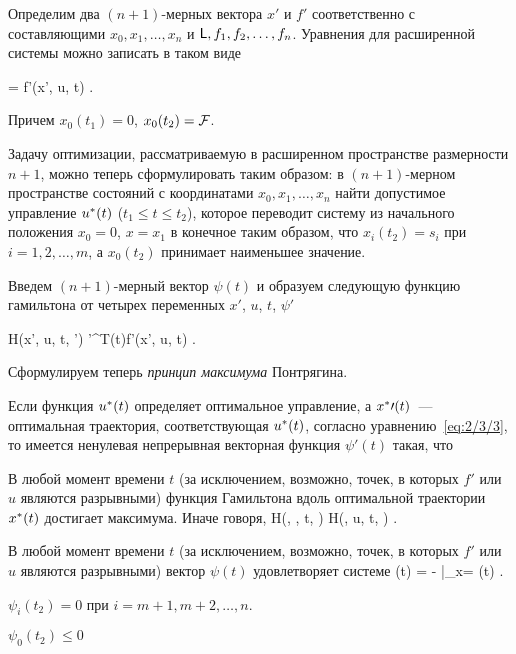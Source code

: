 Определим два $(n+1)$-мерных вектора $x'$ и $f'$ соответственно с составляющими $x_0, x_1, \ldots, x_n$ и $\mathsf{L}, f_1, f_2, \ldots, f_n$. Уравнения для расширенной системы можно записать в таком виде

     = f'(x', u, t) \mbox{.}
\eeq

Причем $x_0(t_1) = 0$, $x_0(t_2) = \mathcal{F}$.

Задачу оптимизации, рассматриваемую в расширенном пространстве размерности $n+1$, можно теперь сформулировать таким образом: в $(n+1)$-мерном пространстве состояний с координатами $x_0, x_1, \ldots, x_n$ найти допустимое управление $u^{*}(t)$ ($t_1 \leqslant t \leqslant t_2$), которое переводит систему из начального положения $x_0 = 0$, $x = x_1$ в конечное таким образом, что $x_i(t_2) = s_i$ при $i = 1, 2, \ldots, m$, а $x_0(t_2)$ принимает наименьшее значение.

Введем $(n+1)$-мерный вектор $\psi(t)$ и образуем следующую функцию гамильтона от четырех переменных $x'$, $u$, $t$, $\psi'$

    H(x', u, t, \psi') \eqdef \psi'^T(t)f'(x', u, t) \mbox{.}
\eeq

Сформулируем теперь \emph{принцип максимума} Понтрягина.

	Если функция $u^{*}(t)$ определяет оптимальное управление, а $x^{*}\prime(t)$~--- оптимальная траектория, соответствующая $u^{*}(t)$, согласно уравнению~\ref{eq:2/3/3}, то имеется ненулевая непрерывная векторная функция $\psi\prime(t)$ такая, что
	\benum
		\item
			В любой момент времени $t$ (за исключением, возможно, точек, в которых $f'$ или $u$ являются разрывными) функция Гамильтона вдоль оптимальной траектории $x^{*}(t)$ достигает максимума. Иначе говоря,
			\beqn
				H(\optX\prime, \optU, t, \psi\prime) \geqslant H(\optX\prime, u, t, \psi\prime) \mbox{.}
			\eeqn
		
		\item
			В любой момент времени $t$ (за исключением, возможно, точек, в которых $f'$ или $u$ являются разрывными) вектор $\psi(t)$ удовлетворяет системе
			\beq{eq:2/3/5}
				\dot{\psi}\prime(t) = - \biggm|_{x\prime = \optX(t)} \mbox{.}
			\eeq
		
		\item
			$\psi_i(t_2) = 0$ при $i= m+1, m+2, \ldots, n$.
		
		\item
			$\psi_0(t_2) \leqslant 0$
	\eenum
\eteo

